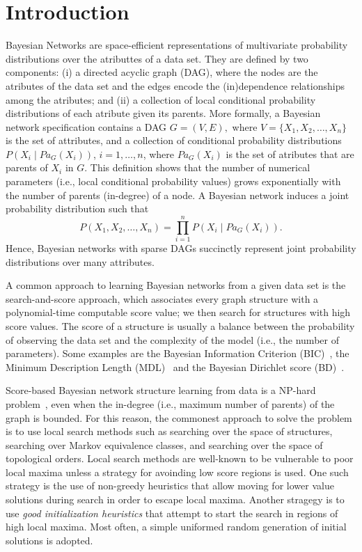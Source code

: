 \section{Introduction}
\label{sec:introduction}

Bayesian Networks are space-efficient representations of multivariate
probability distributions over the atributtes of a data set. They are
defined by two components: (i) a directed acyclic graph (DAG), where the
nodes are the atributes of the data set and the edges encode the
(in)dependence relationships among the atributes; and (ii) a collection
of local conditional probability distributions of each atribute given
its parents. More formally, a Bayesian network specification contains a
DAG \( G = ( V , E ), \) where $V = \{ X_1 , X_2 , \ldots , X_n \}$ is
the set of attributes, and a collection of conditional probability
distributions \( P( X_i \mid {Pa}_G( X_i ) ) \), $i=1,\ldots,n$, where
${Pa}_G( X_i )$ is the set of atributes that are parents of $X_i$ in
$G$. This definition shows that the number of numerical parameters
(i.e., local conditional probability values) grows exponentially with
the number of parents (in-degree) of a node. A Bayesian network induces
a joint probability distribution such that
\[ P( X_1 , X_2 , \ldots , X_n ) = \prod_{i=1}^{n} P( X_i \mid {Pa}_G( X_i ) ).  \]
Hence, Bayesian networks with sparse DAGs succinctly represent joint
probability distributions over many attributes.

A common approach to learning Bayesian networks from a given data set is
the search-and-score approach, which associates every graph structure
with a polynomial-time computable score value; we then search
for structures with high score values. The score of a structure is
usually a balance between the probability of observing the data set and
the complexity of the model (i.e., the number of parameters). Some
examples are the Bayesian Information Criterion (BIC)~\cite{BIC91}, the
Minimum Description Length (MDL)~\cite{MDL94} and the Bayesian Dirichlet
score (BD)~\cite{BD95}.


Score-based Bayesian network structure learning from data is a NP-hard
problem~\cite{MSResearch04}, even when the in-degree (i.e., maximum
number of parents) of the graph is bounded. For this reason, the
commonest approach to solve the problem is to use local search methods
such as searching over the space of structures, searching over Markov
equivalence classes, and searching over the space of topological
orders. Local search methods are well-known to be vulnerable to poor
local maxima unless a strategy for avoinding low score regions is
used. One such strategy is the use of non-greedy heuristics that allow
moving for lower value solutions during search in order to escape local
maxima. Another stragegy is to use \emph{good initialization heuristics}
that attempt to start the search in regions of high local maxima. Most
often, a simple uniformed random generation of initial solutions is
adopted.

